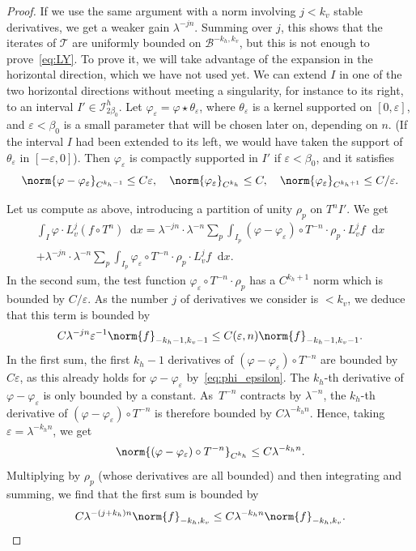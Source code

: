 \documentclass[10pt]{amsart}
\newcommand{\boI}{\mathcal{I}}
\newcommand{\boB}{\mathcal{B}}
\newcommand{\boT}{\mathcal{T}}
\newcommand{\dd}{\mathop{}\!\mathrm{d}}
\let\epsilon\varepsilon
\let\phi\varphi
\theoremstyle{definition}
\numberwithin{equation}{section}
\begin{document}
\begin{proof}
If we use the same argument with a norm involving $j < k_v$ stable
derivatives, we get a weaker gain $\lambda^{-jn}$. Summing over $j$, this
shows that the iterates of $\boT$ are uniformly bounded on $\boB^{-k_h,
k_v}$, but this is not enough to prove~\eqref{eq:LY}. To prove it, we will
take advantage of the expansion in the horizontal direction, which we have
not used yet. We can extend $I$ in one of the two horizontal directions
without meeting a singularity, for instance to its right, to an interval $I'
\in \boI^h_{2\beta_0}$. Let $\phi_\epsilon = \phi \star \theta_\epsilon$, where $\theta_\epsilon$ is a kernel supported on $[0,\epsilon]$, and
$\epsilon<\beta_0$ is a small parameter that will be chosen later on,
depending on $n$. (If the interval $I$ had been extended to its left, we
would have taken the support of $\theta_\epsilon$ in $[-\epsilon, 0]$). Then
$\phi_\epsilon$ is compactly supported in $I'$ if $\epsilon<\beta_0$, and it
satisfies
\begin{equation}
\label{eq:phi_epsilon}
\norm{\phi-\phi_\epsilon}_{C^{k_h-1}} \leq C \epsilon,\quad
\norm{\phi_\epsilon}_{C^{k_h}} \leq C, \quad
\norm{\phi_\epsilon}_{C^{k_h+1}} \leq C/\epsilon.
\end{equation}

Let us compute as above, introducing a partition of unity $\rho_p$ on $T^n
I'$. We get
\begin{multline*}
\int_I \phi \cdot L_v^j(f \circ T^n) \dd x
= \lambda^{-jn} \cdot \lambda^{-n} \sum_p \int_{I_p} (\phi-\phi_\epsilon) \circ T^{-n} \cdot \rho_p \cdot L_v^j f \dd x
\\[-5pt] + \lambda^{-jn} \cdot \lambda^{-n} \sum_p \int_{I_p} \phi_\epsilon \circ T^{-n} \cdot \rho_p \cdot L_v^j f \dd x.
\end{multline*}
In the second sum, the test function $\phi_\epsilon \circ T^{-n} \cdot
\rho_p$ has a $C^{k_h+1}$ norm which is bounded by $C/\epsilon$. As the
number $j$ of derivatives we consider is $<k_v$, we deduce that this term is
bounded by
\[
C \lambda^{-jn} \epsilon^{-1} \norm{f}_{-k_h-1, k_v-1} \leq
C(\epsilon, n) \norm{f}_{-k_h-1, k_v-1}.
\]
In the first sum, the first $k_h-1$
derivatives of $(\phi-\phi_\epsilon) \circ T^{-n}$ are bounded by
$C\epsilon$, as this already holds for $\phi-\phi_\epsilon$
by~\eqref{eq:phi_epsilon}. The $k_h$-th derivative of $\phi-\phi_\epsilon$ is
only bounded by a constant. As~$T^{-n}$ contracts by $\lambda^{-n}$, the
$k_h$-th derivative of $(\phi-\phi_\epsilon) \circ T^{-n}$ is therefore
bounded by $C \lambda^{-k_h n}$. Hence, taking $\epsilon = \lambda^{-k_h n}$,
we get
\[
\norm{(\phi-\phi_\epsilon) \circ T^{-n}}_{C^{k_h}} \leq C
\lambda^{-k_h n}.
\]
Multiplying by $\rho_p$ (whose derivatives are all
bounded) and then integrating and summing, we find that the first sum is
bounded by
\[
C \lambda^{-(j+k_h)n} \norm{f}_{-k_h, k_v} \leq C \lambda^{-k_h
n} \norm{f}_{-k_h, k_v}.
\]


\end{proof}
\end{document}
